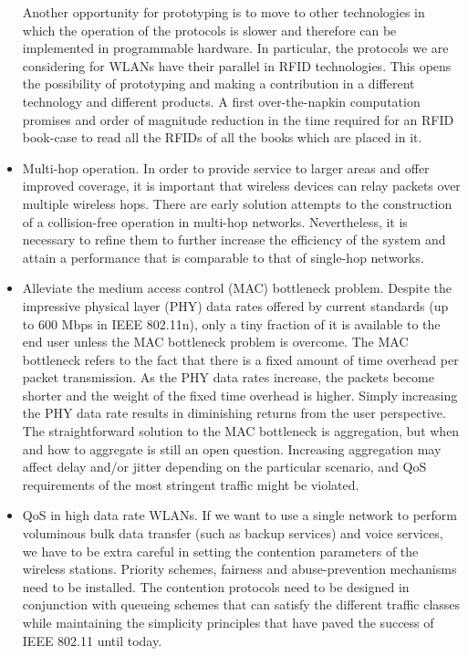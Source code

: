 \documentclass[a4paper,twocolumns]{article}%
\begin{document}
\begin{itemize}
Another opportunity for prototyping is to move to other technologies in which the operation of the protocols is slower and therefore can be implemented in programmable hardware.
In particular, the protocols we are considering for WLANs have their parallel in RFID technologies.
This opens the possibility of prototyping and making a contribution in a different technology and different products.
A first over-the-napkin computation promises and order of magnitude reduction in the time required for an RFID book-case to read all the RFIDs of all the books which are placed in it.
\item Multi-hop operation.
In order to provide service to larger areas and offer improved coverage, it is important that wireless devices can relay packets over multiple wireless hops.
There are early solution attempts to the construction of a collision-free operation in multi-hop networks.
Nevertheless, it is necessary to refine them to further increase the efficiency of the system and attain a performance that is comparable to that of single-hop networks.
\item Alleviate the medium access control (MAC) bottleneck problem.
Despite the impressive physical layer (PHY) data rates offered by current standards (up to 600 Mbps in IEEE 802.11n), only a tiny fraction of it is available to the end user unless the MAC bottleneck problem is overcome.
The MAC bottleneck refers to the fact that there is a fixed amount of time overhead per packet transmission.
As the PHY data rates increase, the packets become shorter and the weight of the fixed time overhead is higher.
Simply increasing the PHY data rate results in diminishing returns from the user perspective.
The straightforward solution to the MAC bottleneck is aggregation, but when and how to aggregate is still an open question.
Increasing aggregation may affect delay and/or jitter depending on the particular scenario, and QoS requirements of the most stringent traffic might be violated. 
\item QoS in high data rate WLANs. 
If we want to use a single network to perform voluminous bulk data transfer (such as backup services) and voice services, we have to be extra careful in setting the contention parameters of the wireless stations.
Priority schemes, fairness and abuse-prevention mechanisms need to be installed.
The contention protocols need to be designed in conjunction with queueing schemes that can satisfy the different traffic classes while maintaining the simplicity principles that have paved the success of IEEE 802.11 until today.

\end{itemize}
\end{document}
